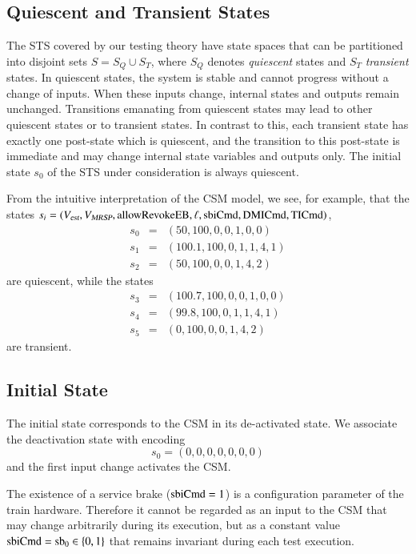 \subsection{Quiescent and Transient States}

The STS covered by our testing theory have state spaces that can be partitioned into disjoint sets $S = S_Q \cup S_T$, where $S_Q$ denotes {\it quiescent} states and $S_T$ {\it transient} states.
In quiescent states, the system is stable and cannot progress without a change of inputs. When these inputs change, internal states and outputs remain unchanged. Transitions emanating from quiescent states may lead to other quiescent states or to transient states. In contrast to this, each transient state has exactly one  post-state which is quiescent, and the transition to this post-state is immediate and may change internal state variables and outputs only. The initial state $s_0$ of the
STS under consideration is always quiescent.

From the intuitive interpretation of the CSM model, we see, for example, that the states
$s_i = ({V_{\text{\sl est}}}, {V_{\text{\sl MRSP}}},\text{allowRevokeEB},\ell,\text{sbiCmd},\text{DMICmd},\text{TICmd})$, 
\begin{eqnarray*}
s_0 & = & (50,100,0,0,1,0,0)
\\
s_1 & = & (100.1,100,0,1,1,4,1)
\\
s_2 & = & (50,100,0,0,1,4,2)
\end{eqnarray*}
are quiescent, while the states
\begin{eqnarray*}
s_3 & = & (100.7,100,0,0,1,0,0)
\\
s_4 & = & (99.8,100,0,1,1,4,1)
\\
s_5 & = & (0,100,0,0,1,4,2)
\end{eqnarray*}
are transient.




\subsection{Initial State}\label{sec:initialstate}

The initial state corresponds to the CSM in its de-activated state. We associate the deactivation state with encoding 
$$
s_0 = (0,0,0,0,0,0,0)
$$
and the first input change activates the CSM.

The existence of a service brake ($\text{sbiCmd} = 1$) is a configuration parameter of the train hardware. Therefore it cannot be regarded as an input to the CSM that may change arbitrarily during its execution, but as a constant value $\text{sbiCmd} = \text{sb}_0  \in \{0,1\}$ that remains invariant during each test execution.


